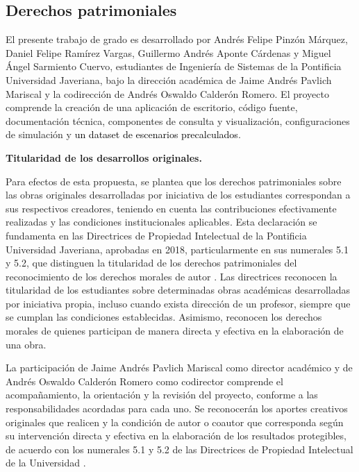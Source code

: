 \subsection{Derechos patrimoniales}
\label{sec:derechos-patrimoniales}

El presente trabajo de grado es desarrollado por Andrés Felipe Pinzón Márquez, Daniel Felipe Ramírez Vargas, Guillermo Andrés Aponte Cárdenas y Miguel Ángel Sarmiento Cuervo, estudiantes de Ingeniería de Sistemas de la Pontificia Universidad Javeriana, bajo la dirección académica de Jaime Andrés Pavlich Mariscal y la codirección de Andrés Oswaldo Calderón Romero. El proyecto comprende la creación de una aplicación de escritorio, código fuente, documentación técnica, componentes de consulta y visualización, configuraciones de simulación y \textcolor{black}{un dataset de escenarios precalculados}.

\textbf{Titularidad de los desarrollos originales.}

Para efectos de esta propuesta, se plantea que los derechos patrimoniales sobre las obras originales desarrolladas por iniciativa de los estudiantes correspondan a sus respectivos creadores, teniendo en cuenta las contribuciones efectivamente realizadas y las condiciones institucionales aplicables. Esta declaración se fundamenta en las Directrices de Propiedad Intelectual de la Pontificia Universidad Javeriana, aprobadas en 2018, particularmente en sus numerales 5.1 y 5.2, que distinguen la titularidad de los derechos patrimoniales del reconocimiento de los derechos morales de autor \cite{vfpJaverianaDirectrices2018}. Las directrices reconocen la titularidad de los estudiantes sobre determinadas obras académicas desarrolladas por iniciativa propia, incluso cuando exista dirección de un profesor, siempre que se cumplan las condiciones establecidas. Asimismo, reconocen los derechos morales de quienes participan de manera directa y efectiva en la elaboración de una obra.

La participación de Jaime Andrés Pavlich Mariscal como director académico y de Andrés Oswaldo Calderón Romero como codirector comprende el acompañamiento, la orientación y la revisión del proyecto, conforme a las responsabilidades acordadas para cada uno. Se reconocerán los aportes creativos originales que realicen y la condición de autor o coautor que corresponda según su intervención directa y efectiva en la elaboración de los resultados protegibles, de acuerdo con los numerales 5.1 y 5.2 de las Directrices de Propiedad Intelectual de la Universidad \cite{vfpJaverianaDirectrices2018}.

